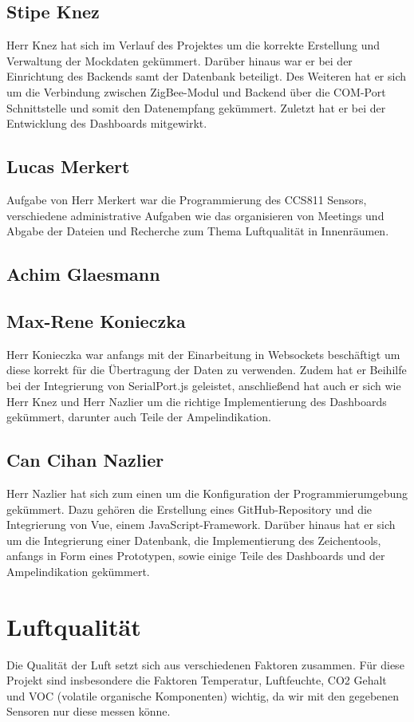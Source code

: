 \documentclass[]{article}
\begin{document}
		\subsection{Stipe Knez}
			Herr Knez hat sich im Verlauf des Projektes um die korrekte Erstellung und Verwaltung der Mockdaten gekümmert. Darüber hinaus war er bei der Einrichtung des Backends samt der Datenbank beteiligt. Des Weiteren hat er sich um die Verbindung zwischen ZigBee-Modul und Backend über die COM-Port Schnittstelle und somit den Datenempfang gekümmert. Zuletzt hat er bei der Entwicklung des Dashboards mitgewirkt. 
		\subsection{Lucas Merkert}
			Aufgabe von Herr Merkert war die Programmierung des CCS811 Sensors, verschiedene administrative Aufgaben wie das organisieren von Meetings und Abgabe der Dateien und Recherche zum Thema Luftqualität in Innenräumen.
		\subsection{Achim Glaesmann}
		\subsection{Max-Rene Konieczka}
			Herr Konieczka war anfangs mit der Einarbeitung in Websockets beschäftigt um diese korrekt für die Übertragung der Daten zu verwenden. Zudem hat er Beihilfe bei der Integrierung von SerialPort.js geleistet, anschließend hat auch er sich wie Herr Knez und Herr Nazlier um die richtige Implementierung des Dashboards gekümmert, darunter auch Teile der Ampelindikation. 
		\subsection{Can Cihan Nazlier}
			Herr Nazlier hat sich zum einen um die Konfiguration der Programmierumgebung gekümmert. Dazu gehören die Erstellung eines GitHub-Repository und die Integrierung von Vue, einem JavaScript-Framework. Darüber hinaus hat er sich um die Integrierung einer Datenbank, die Implementierung des Zeichentools, anfangs in Form eines Prototypen, sowie einige Teile des Dashboards und der Ampelindikation gekümmert.
			\newpage
		
	\section{Luftqualität}%
		Die Qualität der Luft setzt sich aus verschiedenen Faktoren zusammen. Für diese Projekt sind insbesondere die Faktoren Temperatur, Luftfeuchte, CO2 Gehalt und VOC (volatile organische Komponenten) wichtig, da wir mit den gegebenen Sensoren nur diese messen könne.
\end{document}
